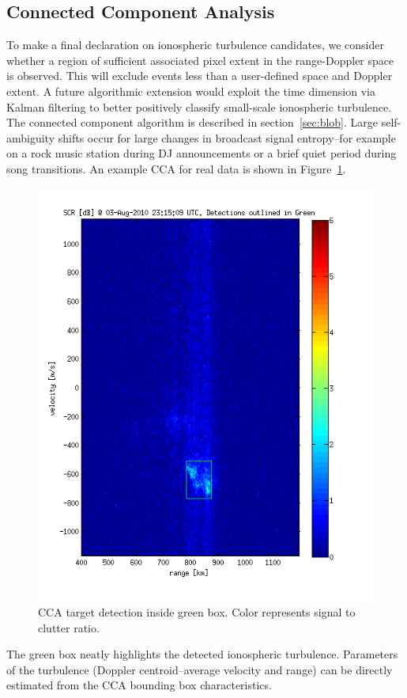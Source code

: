 \subsection{Connected Component Analysis}
To make a final declaration on ionospheric turbulence candidates, we consider whether a region of sufficient associated pixel extent in the range-Doppler space is observed. 
This will exclude events less than a user-defined space and Doppler extent. 
A future algorithmic extension would exploit the time dimension via Kalman filtering to better positively classify small-scale ionospheric turbulence. 
The connected component algorithm is described in section~\ref{sec:blob}.
Large self-ambiguity shifts occur for large changes in broadcast signal entropy--for example on a rock music station during DJ announcements or a brief quiet period during song transitions. 
An example CCA for real data is shown in Figure~\ref{fig:ccaout}.
\begin{figure}
    \includegraphics[width=\linewidth]{gfx/ccaout}
    \caption{CCA target detection inside green box. Color represents signal to clutter ratio.}
    \label{fig:ccaout}
\end{figure}
The green box neatly highlights the detected ionospheric turbulence. 
Parameters of the turbulence (Doppler centroid--average velocity and range) can be directly estimated from the CCA bounding box characteristics.

